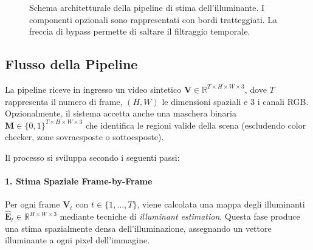 \begin{figure}[ht]
\caption{Schema architetturale della pipeline di stima dell'illuminante. I componenti opzionali sono rappresentati con bordi tratteggiati. La freccia di bypass permette di saltare il filtraggio temporale.}
\label{fig:pipeline_overview}
\end{figure}

\subsection{Flusso della Pipeline}
La pipeline riceve in ingresso un video sintetico $\mathbf{V} \in \mathbb{R}^{T \times H \times W \times 3}$, dove $T$ rappresenta il numero di frame, $(H, W)$ le dimensioni spaziali e $3$ i canali RGB. Opzionalmente, il sistema accetta anche una maschera binaria $\mathbf{M} \in \{0,1\}^{T \times H \times W \times 3}$ che identifica le regioni valide della scena (escludendo color checker, zone sovraesposte o sottoesposte).

Il processo si sviluppa secondo i seguenti passi:

\paragraph{1. Stima Spaziale Frame-by-Frame}
Per ogni frame $\mathbf{V}_t$ con $t \in \{1, \ldots, T\}$, viene calcolata una mappa degli illuminanti $\hat{\mathbf{E}}_t \in \mathbb{R}^{H \times W \times 3}$ mediante tecniche di \emph{illuminant estimation}. Questa fase produce una stima spazialmente densa dell'illuminazione, assegnando un vettore illuminante a ogni pixel dell'immagine.

